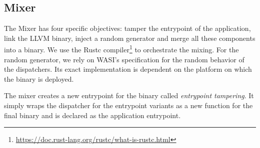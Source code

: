 \subsection*{Mixer}

The Mixer has four specific objectives: tamper the entrypoint of the application, link the LLVM binary, inject a random generator and merge all these components into a \wasm binary.
We use the Rustc compiler\footnote{\url{https://doc.rust-lang.org/rustc/what-is-rustc.html}} to orchestrate the mixing.
For the random generator, we rely on WASI's specification \cite{WASI} for the random behavior of the dispatchers. Its exact implementation is dependent on the platform on which the binary is deployed.

The \tool mixer creates a new entrypoint for the binary called \emph{entrypoint tampering}.
It simply wraps the dispatcher for the entrypoint variants as a new function for the final binary and is declared as the application entrypoint. %






